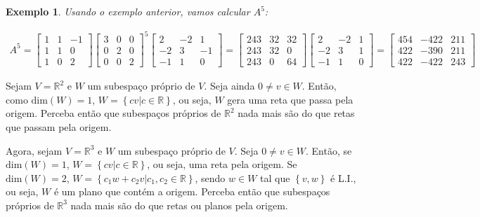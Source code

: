 \documentclass{article}
\newtheorem*{example}{Exemplo}
\begin{document}
\begin{example}
	Usando o exemplo anterior, vamos calcular $A^5$:
	
	\begin{align*}
	A^5 = \begin{bmatrix}
	1 & 1 & -1 \\
	1 & 1 & 0 \\
	1 & 0 & 2 
	\end{bmatrix}\begin{bmatrix}
	3 & 0 & 0 \\
	0 & 2 & 0 \\
	0 & 0 & 2
	\end{bmatrix}^5\begin{bmatrix}
	2 & -2 & 1 \\
	-2 & 3 & -1 \\
	-1 & 1 & 0
	\end{bmatrix} = \begin{bmatrix}
	243 & 32 & 32 \\
	243 & 32 & 0 \\
	243 & 0 & 64
	\end{bmatrix}\begin{bmatrix}
	2 & -2 & 1 \\
	-2 & 3 & 1 \\
	-1 & 1 & 0
	\end{bmatrix} = \begin{bmatrix}
	454 & -422 & 211 \\
	422 & -390 & 211 \\
	422 & -422 & 243
	\end{bmatrix}
	\end{align*}
	
\end{example}

\par\vspace{0.3cm} Sejam $V = \mathbb{R}^2$ e $W$ um subespaço próprio de $V$. Seja ainda $0\neq v\in W$. Então, como $\text{dim}(W) = 1$, $W = \left\{ cv|c\in\mathbb{R}  \right\}$, ou seja, $W$ gera uma reta que passa pela origem. Perceba então que subespaços próprios de $\mathbb{R}^2$ nada mais são do que retas que passam pela origem.

\par\vspace{0.3cm} Agora, sejam $V = \mathbb{R}^3$ e $W$ um subespaço próprio de $V$. Seja $0\neq v\in W$. Então, se $\text{dim}(W) = 1$, $W = \left\{ cv|c\in\mathbb{R} \right\}$, ou seja, uma reta pela origem. Se $\text{dim}(W) = 2$, $W = \left\{ c_1w + c_2v|c_1,c_2\in\mathbb{R}  \right\}$, sendo $w\in W$ tal que $\left\{v,w\right\}$ é L.I., ou seja, $W$ é um plano que contém a origem. Perceba então que subespaços próprios de $\mathbb{R}^3$ nada mais são do que retas ou planos pela origem.
\end{document}
